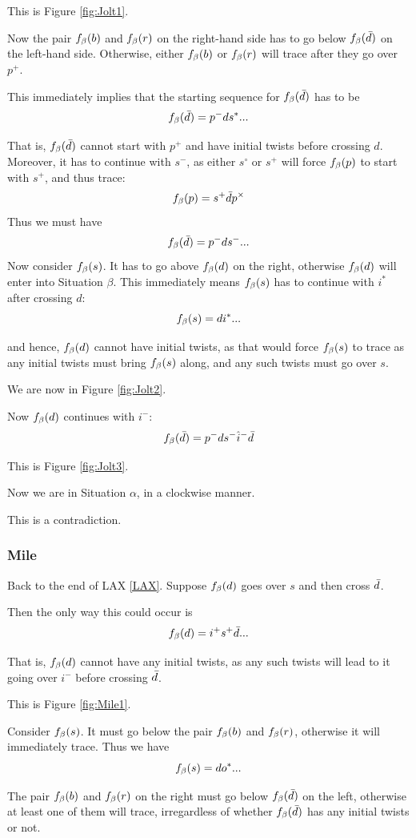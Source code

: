 This is Figure \ref{fig:Jolt1}.

Now the pair $f_\beta(b)$ and $f_\beta(r)$ on the right-hand side has to go below $f_\beta(\bar{d})$ on the left-hand side. Otherwise, either $f_\beta(b)$ or $f_\beta(r)$ will trace after they go over $p^+$. 

This immediately implies that the starting sequence for $f_\beta(\bar{d})$ has to be
\[
f_\beta(\bar{d}) = p^- d s^*...
\]

That is, $f_\beta(\bar{d})$ cannot start with $p^+$ and have initial twists before crossing $d$. Moreover, it has to continue with $s^-$, as either $s^\circ$ or $s^+$ will force $f_\beta(p)$ to start with $s^+$, and thus trace:
\[
f_\beta(p) = s^+ \bar{d} p^\times
\]
Thus we must have
\[
f_\beta(\bar{d}) = p^- d s^-...
\]
Now consider $f_\beta(s)$. It has to go above $f_\beta(d)$ on the right, otherwise $f_\beta(d)$ will enter into Situation $\beta$. This immediately means $f_\beta(s)$ has to continue with $i^*$ after crossing $d$:
\[
f_\beta(s) = d i^*...
\]

and hence, $f_\beta(d)$ cannot have initial twists, as that would force $f_\beta(s)$ to trace as any initial twists must bring $f_\beta(s)$ along, and any such twists must go over $s$. 

We are now in Figure \ref{fig:Jolt2}.

Now $f_\beta(d)$ continues with $i^-$:
\[
f_\beta(\bar{d}) = p^- d s^- \hat{i}^- \bar{d} 
\]

This is Figure \ref{fig:Jolt3}.

Now we are in Situation $\alpha$, in a clockwise manner.

This is a contradiction.

\subsubsection{Mile} \label{Mile}
Back to the end of LAX \ref{LAX}. Suppose $f_\beta(d)$ goes over $s$ and then cross $\bar{d}$.

Then the only way this could occur is 
\[
f_\beta(d) = i^+ s^+ \bar{d}...
\]

That is, $f_\beta(d)$ cannot have any initial twists, as any such twists will lead to it going over $i^-$ before crossing $\bar{d}$.

This is Figure \ref{fig:Mile1}.

Consider $f_\beta(s)$. It must go below the pair $f_\beta(b)$ and $f_\beta(r)$, otherwise it will immediately trace. Thus we have
\[
f_\beta(s) = d o^*...
\]

The pair $f_\beta(b)$ and $f_\beta(r)$ on the right must go below $f_\beta(\bar{d})$ on the left, otherwise at least one of them will trace, irregardless of whether $f_\beta(\bar{d})$ has any initial twists or not. 

